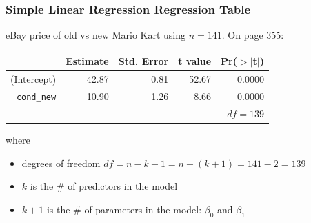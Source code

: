 \documentclass[handout]{beamer}
\newcommand{\blue}[1]{\textcolor{blue2}{#1}}
\begin{document}

%
%
%
%
%


\begin{frame}[fragile]
\frametitle{Simple Linear Regression Regression Table}

eBay price of old vs new Mario Kart using $n=141$.  On page 355:

\begin{table}[ht]
\centering
\begin{tabular}{r|rrrr}
  \hline
 & Estimate & Std. Error & t value & Pr($>$$|$t$|$) \\ 
  \hline
(Intercept) & 42.87 & 0.81 & 52.67 & 0.0000 \\ 
{\tt cond\_new} & 10.90 & 1.26 & 8.66 & 0.0000 \\ 
   \hline
   & & & & $df=139$\\
\end{tabular}
\end{table}

%
%
\pause where
\begin{itemize}
\item degrees of freedom $df=n-k-1 = n -(k+1) =141-2=139$
\item $k$ is the \# of predictors in the model
\item $k+1$ is the \# of parameters in the model: $\beta_0$ and $\beta_1$
\end{itemize}

\end{frame}
\end{document}
